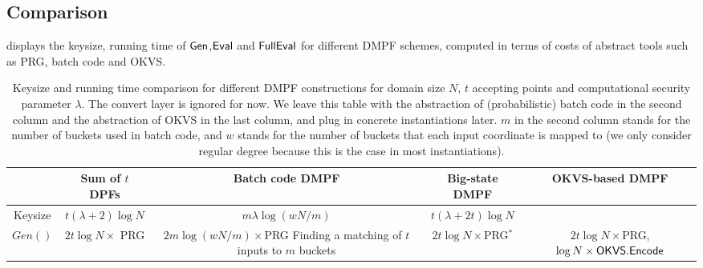 \subsection{Comparison}
 displays the keysize, running time of ${\sf Gen}$,${\sf Eval}$ and ${\sf FullEval}$ for different DMPF schemes, computed in terms of costs of abstract tools such as PRG, batch code and OKVS. 
	\begin{table*}
    \renewcommand\arraystretch{1.5}
    \begin{threeparttable}
    \caption{Keysize and running time comparison for different DMPF constructions for domain size $N$, $t$ accepting points and computational security parameter $\lambda$. The convert layer is ignored for now. We leave this table with the abstraction of (probabilistic) batch code in the second column and the abstraction of OKVS in the last column, and plug in concrete instantiations later. $m$ in the second column stands for the number of buckets used in batch code, and $w$ stands for the number of buckets that each input coordinate is mapped to (we only consider regular degree because this is the case in most instantiations). }
    \label{tab:formulas_DMPF_comparison}
			\begin{tabular}{ccccc}
				\toprule 
				 &Sum of $t$ DPFs & Batch code DMPF\cite{cryptoeprint:2019/273,cryptoeprint:2019/1084,cryptoeprint:2021/580,cryptoeprint:2017/1142} & Big-state DMPF & OKVS-based DMPF\\

        \midrule

				Keysize & $t(\lambda+2)\log N$ & $m\lambda\log(wN/m)$ & $t(\lambda+2t)\log N$ &\makecell{ $\log N\times\OKVS$ code size}\\

                \cline{1-5}
				
				$Gen()$ & $2t\log N\times $ PRG &\makecell{$2m\log(wN/m)\times $PRG\\Finding a matching of $t$ inputs to $m$ buckets} &$2t\log N\times$PRG$^*$\tnote{1}
        & \makecell{$2t\log N\times$PRG, \\$\log N\times {\sf OKVS}.{\sf Encode}$} \\


\end{tabular}
\end{threeparttable}
\end{table*}
